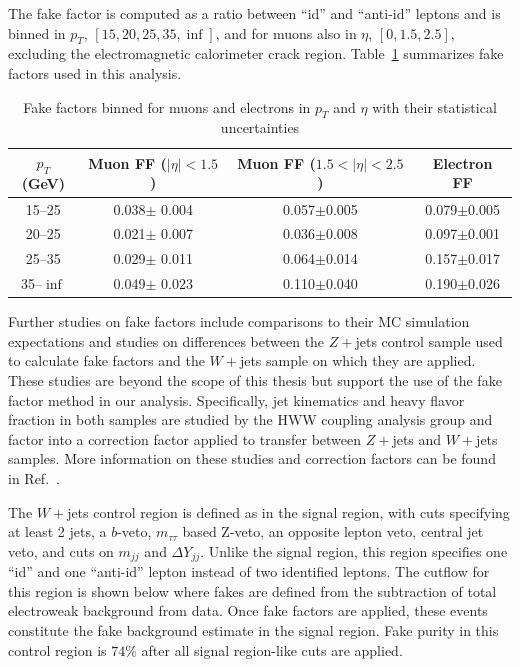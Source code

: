 The fake factor is computed as a ratio between ``id'' and ``anti-id'' leptons and is binned in $p_T$, $[15,20,25,35,\inf]$, and for muons also in $\eta$, $[0,1.5,2.5]$, excluding the electromagnetic calorimeter crack region. Table~\ref{tab:FakeFactors} summarizes fake factors used in this analysis.

\begin{table}[tb]
\centering
\caption{Fake factors binned for muons and electrons in $p_T$ and $\eta$ with their statistical uncertainties}
\label{tab:FakeFactors}
\begin{tabular}{c|c|c|c}
$p_T$(GeV) & Muon FF ($|\eta|<1.5$) & Muon FF ($1.5<|\eta|<2.5$) & Electron FF \\
\hline
15--25 & 0.038$\pm$ 0.004 & 0.057$\pm$0.005 & 0.079$\pm$0.005 \\
20--25 & 0.021$\pm$ 0.007 & 0.036$\pm$0.008 & 0.097$\pm$0.001 \\
25--35 & 0.029$\pm$ 0.011 & 0.064$\pm$0.014 & 0.157$\pm$0.017 \\
35--$\inf$ & 0.049$\pm$ 0.023 & 0.110$\pm$0.040 & 0.190$\pm$0.026 \\
\end{tabular}
\end{table}

Further studies on fake factors include comparisons to their MC simulation expectations and studies on differences between the $Z+$jets control sample used to calculate fake factors and the $W+$jets sample on which they are applied. These studies are beyond the scope of this thesis but support the use of the fake factor method in our analysis. Specifically, jet kinematics and heavy flavor fraction in both samples are studied by the HWW coupling analysis group and factor into a correction factor applied to transfer between $Z+$jets and $W+$jets samples. More information on these studies and correction factors can be found in Ref.~\cite{Aaboud_2019}.

The $W+$jets control region is defined as in the signal region, with cuts specifying at least 2 jets, a $b$-veto, $m_{\tau\tau}$ based Z-veto, an opposite lepton veto, central jet veto, and cuts on $m_{jj}$ and $\Delta Y_{jj}$. Unlike the signal region, this region specifies one ``id'' and one ``anti-id'' lepton instead of two identified leptons. The cutflow for this region is shown below where fakes are defined from the subtraction of total electroweak background from data. Once fake factors are applied, these events constitute the fake background estimate in the signal region. Fake purity in this control region is $74\%$ after all signal region-like cuts are applied.

